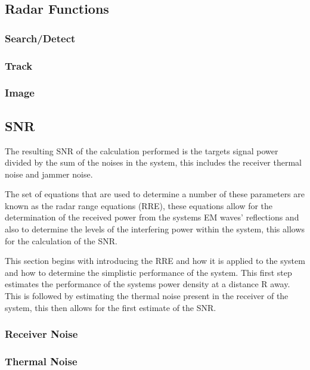 \documentclass[11pt]{witseiepaper}
\begin{document}
\subsection{Radar Functions} \label{sec:RadarFunctions}

\subsubsection{Search/Detect} \label{sec:SearchDetect}

\subsubsection{Track} \label{sec:Track}

\subsubsection{Image} \label{sec:Image}

\subsection{SNR} \label{sec:SNR}

The resulting SNR of the calculation performed is the targets signal power divided by the sum of the noises in the system, this includes the receiver thermal noise and jammer noise.

The set of equations that are used to determine a number of these parameters are known as the radar range equations (RRE), these equations allow for the determination of the received power from the systems EM waves' reflections and also to determine the levels of the interfering power within the system, this allows for the calculation of the SNR.

This section begins with introducing the RRE and how it is applied to the system and how to determine the simplistic performance of the system. This first step estimates the performance of the systems power density at a distance R away. This is followed by estimating the thermal noise present in the receiver of the system, this then allows for the first estimate of the SNR. 


\subsubsection{Receiver Noise} \label{sec:ReceiverNoise}

\subsubsection{Thermal Noise} \label{sec:ThermalNoise}
\end{document}
